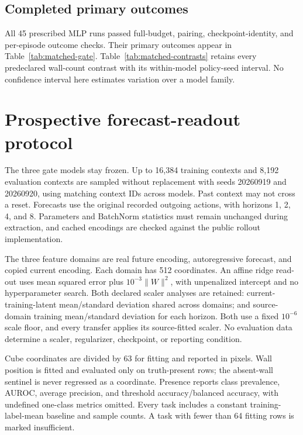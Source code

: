 \subsection{Completed primary outcomes}
All 45 prescribed MLP runs passed full-budget, pairing, checkpoint-identity, and per-episode outcome
checks. Their primary outcomes appear in Table~\ref{tab:matched-gate}. Table~\ref{tab:matched-contrasts}
retains every predeclared wall-count contrast with its within-model policy-seed interval. No confidence
interval here estimates variation over a model family.

\begin{table}[ht]
\centering
\caption{Matched primary wall-count differences. Intervals are 95\% percentile bootstraps over
five paired policy seeds within one fixed model, conditional on its evaluation set. They are
unadjusted descriptive intervals; all three prespecified contrasts are retained.}
\label{tab:matched-contrasts}
\end{table}

\section{Prospective forecast-readout protocol}
\label{app:forecast}
The three gate models stay frozen. Up to 16,384 training contexts and 8,192 evaluation contexts are
sampled without replacement with seeds 20260919 and 20260920, using matching context IDs across
models. Past context may not cross a reset. Forecasts use the original recorded outgoing actions,
with horizons 1, 2, 4, and 8. Parameters and BatchNorm statistics must remain unchanged during
extraction, and cached encodings are checked against the public rollout implementation.

The three feature domains are real future encoding, autoregressive forecast, and copied current
encoding. Each domain has 512 coordinates. An affine ridge read-out uses mean squared error plus
$10^{-3}\|W\|^2$, with unpenalized intercept and no hyperparameter search. Both declared scaler
analyses are retained: current-training-latent mean/standard deviation shared across domains; and
source-domain training mean/standard deviation for each horizon. Both use a fixed $10^{-6}$ scale
floor, and every transfer applies its source-fitted scaler. No evaluation data determine a scaler,
regularizer, checkpoint, or reporting condition.

Cube coordinates are divided by 63 for fitting and reported in pixels. Wall position is fitted and
evaluated only on truth-present rows; the absent-wall sentinel is never regressed as a coordinate.
Presence reports class prevalence, AUROC, average precision, and threshold accuracy/balanced
accuracy, with undefined one-class metrics omitted. Every task includes a constant training-label-mean
baseline and sample counts. A task with fewer than 64 fitting rows is marked insufficient.


